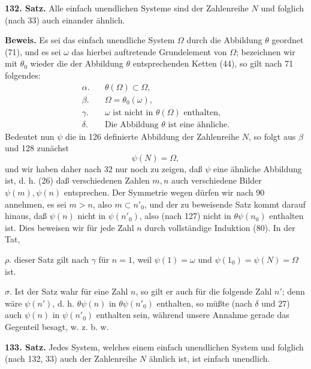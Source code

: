 \documentclass[11pt]{article}
\newcommand{\partof}{\mathrel{\subset}}
\begin{document}
\noindent\textbf{132. Satz.} Alle einfach unendlichen Systeme sind der Zahlenreihe $N$ und folglich (nach 33) auch einander ähnlich.

\noindent\textbf{Beweis.} Es sei das einfach unendliche System $\Omega$ durch die Abbildung $\theta$ geordnet (71), und es sei $\omega$ das hierbei auftretende Grundelement von $\Omega$; bezeichnen wir mit $\theta_0$ wieder die der Abbildung $\theta$ entsprechenden Ketten (44), so gilt nach 71 folgendes:
\begin{align*}
\alpha.\quad& \theta(\Omega)\partof\Omega,\\
\beta.\quad& \Omega=\theta_0(\omega),\\
\gamma.\quad& \omega\text{ ist nicht in }\theta(\Omega)\text{ enthalten,}\\
\delta.\quad& \text{Die Abbildung }\theta\text{ ist eine ähnliche.}
\end{align*}
Bedeutet nun $\psi$ die in 126 definierte Abbildung der Zahlenreihe $N$, so folgt aus $\beta$ und 128 zunächst
\[
\psi(N)=\Omega,
\]
und wir haben daher nach 32 nur noch zu zeigen, daß $\psi$ eine ähnliche Abbildung ist, d. h. (26) daß verschiedenen Zahlen $m,n$ auch verschiedene Bilder $\psi(m),\psi(n)$ entsprechen. Der Symmetrie wegen dürfen wir nach 90 annehmen, es sei $m>n$, also $m\partof n'_0$, und der zu beweisende Satz kommt darauf hinaus, daß $\psi(n)$ nicht in $\psi(n'_0)$, also (nach 127) nicht in $\theta\psi(n_0)$ enthalten ist. Dies beweisen wir für jede Zahl $n$ durch vollständige Induktion (80). In der Tat,

\noindent $\rho.$ dieser Satz gilt nach $\gamma$ für $n=1$, weil $\psi(1)=\omega$ und $\psi(1_0)=\psi(N)=\Omega$ ist.

\noindent $\sigma.$ Ist der Satz wahr für eine Zahl $n$, so gilt er auch für die folgende Zahl $n'$; denn wäre $\psi(n')$, d. h. $\theta\psi(n)$ in $\theta\psi(n'_0)$ enthalten, so müßte (nach $\delta$ und 27) auch $\psi(n)$ in $\psi(n'_0)$ enthalten sein, während unsere Annahme gerade das Gegenteil besagt, w. z. b. w.

\noindent\textbf{133. Satz.} Jedes System, welches einem einfach unendlichen System und folglich (nach 132, 33) auch der Zahlenreihe $N$ ähnlich ist, ist einfach unendlich.
\end{document}
